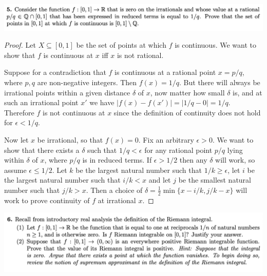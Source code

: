 \newpage
\begin{mdframed}
  \includegraphics[width=400pt]{img/analysis--berkeley-202a--homework-1-5192.png}
\end{mdframed}



\begin{proof}
  Let $X \subseteq [0, 1]$ be the set of points at which $f$ is continuous. We want to show that $f$ is
  continuous at $x$ iff $x$ is not rational.

  Suppose for a contradiction that $f$ is continuous at a rational point $x = p/q$, where $p, q$ are
  non-negative integers. Then $f(x) = 1/q$. But there will always be irrational points within a given
  distance $\delta$ of $x$, now matter how small $\delta$ is, and at such an irrational point $x'$ we
  have $|f(x) - f(x')| = |1/q - 0| = 1/q$. Therefore $f$ is not continuous at $x$ since the definition of
  continuity does not hold for $\epsilon < 1/q$.

  Now let $x$ be irrational, so that $f(x) = 0$. Fix an arbitrary $\epsilon > 0$. We want to show that there
  exists a $\delta$ such that $1/q < \epsilon$ for any rational point $p/q$ lying within $\delta$ of $x$,
  where $p/q$ is in reduced terms. If $\epsilon > 1/2$ then any $\delta$ will work, so
  assume $\epsilon \leq 1/2$. Let $k$ be the largest natural number such that $1/k \geq \epsilon$, let $i$ be
  the largest natural number such that $i/k < x$ and let $j$ be the smallest natural number such
  that $j/k > x$. Then a choice of $\delta = \frac{1}{2}\min\{x - i/k, j/k - x\}$ will work to prove continuity
  of $f$ at irrational $x$.
\end{proof}

\newpage
\begin{mdframed}
  \includegraphics[width=400pt]{img/analysis--berkeley-202a--homework-1-f5e8.png}
\end{mdframed}


